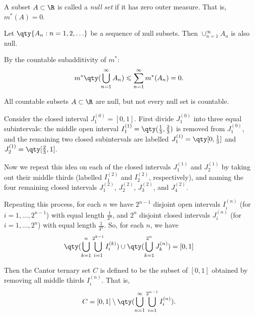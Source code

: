 \documentclass{maths}
\begin{document}
\begin{defn}
    A subset $A\subset\R$ is called a \emph{null set} if it has zero outer measure.
    That is, $m^*(A)=0$.
\end{defn}

\begin{lem}
    Let $\qty{A_n : n = 1,2,\ldots}$ be a sequence of null subsets.
    Then $\cup_{n=1}^{\infty} A_n$ is also null.
\end{lem}

\begin{prf}
    By the countable subadditivity of $m^*$:
    \[
        m^*\qty(\bigcup_{n=1}^{\infty} A_n) \leqslant
        \sum_{n=1}^{\infty} m^*(A_n) =
        0.
    \]
\end{prf}

\begin{rem}
    All countable subsets $A\subset\R$ are null, but not every null set is countable.
\end{rem}

\begin{defn}
    Consider the closed interval $J_1^{(0)}=[0,1]$.
    First divide $J_1^{(0)}$ into three equal subintervals: the middle open interval $I_1^{(1)}=\qty(\frac{1}{3},\frac{2}{3})$ is removed from $J_1^{(0)}$, and the remaining two closed subintervals are labelled $J_1^{(1)}=\qty[0,\frac{1}{3}]$ and $J_2^{(1)}=\qty[\frac{2}{3},1]$.

    Now we repeat this idea on each of the closed intervals $J_1^{(1)}$ and $J_2^{(1)}$ by taking out their middle thirds (labelled $I_1^{(2)}$ and $I_2^{(2)}$, respectively), and naming the four remaining closed intervals $J_1^{(2)}$, $J_2^{(2)}$, $J_3^{(2)}$, and $J_4^{(2)}$.

    Repeating this process, for each $n$ we have $2^{n-1}$ disjoint open intervals $I_i^{(n)}$ (for $i = 1,\ldots,2^{n-1}$) with equal length $\frac{1}{3^n}$, and $2^n$ disjoint closed intervals $J_i^{(n)}$ (for $i = 1,\ldots,2^n$) with equal length $\frac{1}{3^n}$.
    So, for each $n$, we have
    \[
        \qty(\bigcup_{k=1}^n \bigcup_{i=1}^{2^{k-1}} I_i^{(k)}) \cup \qty(\bigcup_{k=1}^{2^n} J_k^{(n)}) =
        [0,1]
    \]

    Then the Cantor ternary set $C$ is defined to be the subset of $[0,1]$ obtained by removing all middle thirds $I_i^{(n)}$.
    That is,
    \[
        C =
        [0,1] \setminus \qty(\bigcup_{n=1}^{\infty} \bigcup_{i=1}^{2^{n-1}} I_i^{(n)}).
    \]
\end{defn}
\end{document}
